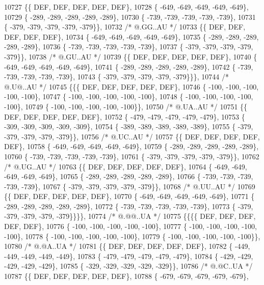 \begin{DoxyCode}
10727 \{\{  DEF,  DEF,  DEF,  DEF,  DEF\},
10728 \{ -649, -649, -649, -649, -649\},
10729 \{ -289, -289, -289, -289, -289\},
10730 \{ -739, -739, -739, -739, -739\},
10731 \{ -379, -379, -379, -379, -379\}\},
10732 \textcolor{comment}{/*  @.GG..AU */}
10733 \{\{  DEF,  DEF,  DEF,  DEF,  DEF\},
10734 \{ -649, -649, -649, -649, -649\},
10735 \{ -289, -289, -289, -289, -289\},
10736 \{ -739, -739, -739, -739, -739\},
10737 \{ -379, -379, -379, -379, -379\}\},
10738 \textcolor{comment}{/*  @.GU..AU */}
10739 \{\{  DEF,  DEF,  DEF,  DEF,  DEF\},
10740 \{ -649, -649, -649, -649, -649\},
10741 \{ -289, -289, -289, -289, -289\},
10742 \{ -739, -739, -739, -739, -739\},
10743 \{ -379, -379, -379, -379, -379\}\}\},
10744 \textcolor{comment}{/*  @.U@..AU */}
10745 \{\{\{  DEF,  DEF,  DEF,  DEF,  DEF\},
10746 \{ -100, -100, -100, -100, -100\},
10747 \{ -100, -100, -100, -100, -100\},
10748 \{ -100, -100, -100, -100, -100\},
10749 \{ -100, -100, -100, -100, -100\}\},
10750 \textcolor{comment}{/*  @.UA..AU */}
10751 \{\{  DEF,  DEF,  DEF,  DEF,  DEF\},
10752 \{ -479, -479, -479, -479, -479\},
10753 \{ -309, -309, -309, -309, -309\},
10754 \{ -389, -389, -389, -389, -389\},
10755 \{ -379, -379, -379, -379, -379\}\},
10756 \textcolor{comment}{/*  @.UC..AU */}
10757 \{\{  DEF,  DEF,  DEF,  DEF,  DEF\},
10758 \{ -649, -649, -649, -649, -649\},
10759 \{ -289, -289, -289, -289, -289\},
10760 \{ -739, -739, -739, -739, -739\},
10761 \{ -379, -379, -379, -379, -379\}\},
10762 \textcolor{comment}{/*  @.UG..AU */}
10763 \{\{  DEF,  DEF,  DEF,  DEF,  DEF\},
10764 \{ -649, -649, -649, -649, -649\},
10765 \{ -289, -289, -289, -289, -289\},
10766 \{ -739, -739, -739, -739, -739\},
10767 \{ -379, -379, -379, -379, -379\}\},
10768 \textcolor{comment}{/*  @.UU..AU */}
10769 \{\{  DEF,  DEF,  DEF,  DEF,  DEF\},
10770 \{ -649, -649, -649, -649, -649\},
10771 \{ -289, -289, -289, -289, -289\},
10772 \{ -739, -739, -739, -739, -739\},
10773 \{ -379, -379, -379, -379, -379\}\}\}\},
10774 \textcolor{comment}{/*  @.@@..UA */}
10775 \{\{\{\{  DEF,  DEF,  DEF,  DEF,  DEF\},
10776 \{ -100, -100, -100, -100, -100\},
10777 \{ -100, -100, -100, -100, -100\},
10778 \{ -100, -100, -100, -100, -100\},
10779 \{ -100, -100, -100, -100, -100\}\},
10780 \textcolor{comment}{/*  @.@A..UA */}
10781 \{\{  DEF,  DEF,  DEF,  DEF,  DEF\},
10782 \{ -449, -449, -449, -449, -449\},
10783 \{ -479, -479, -479, -479, -479\},
10784 \{ -429, -429, -429, -429, -429\},
10785 \{ -329, -329, -329, -329, -329\}\},
10786 \textcolor{comment}{/*  @.@C..UA */}
10787 \{\{  DEF,  DEF,  DEF,  DEF,  DEF\},
10788 \{ -679, -679, -679, -679, -679\},

\end{DoxyCode}
